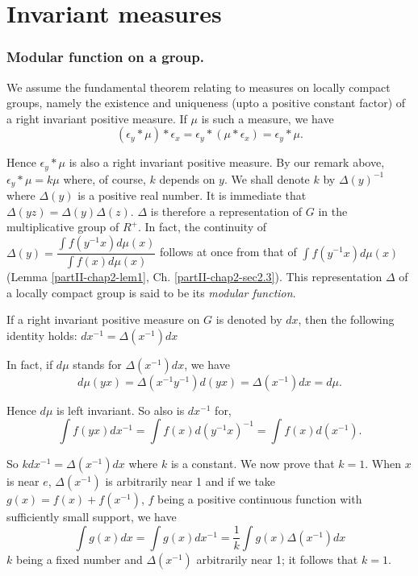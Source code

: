 
\chapter{Invariant measures}\label{partII-chap3}

\setcounter{section}{3}
\setcounter{subsection}{0}
\subsection{Modular function on a
  group.}\label{partII-chap3-sec3.1}\pageoriginale%

We assume the fundamental theorem relating to measures on locally
compact groups, namely the existence and uniqueness (upto a positive
constant factor) of a right invariant positive measure. If $\mu$ is
such a measure, we have 
$$
(\epsilon_y * \mu) * \epsilon_x = \epsilon_y  * (\mu * \epsilon_x) =
\epsilon_y * \mu. 
$$

Hence $\epsilon_y * \mu$ is also a right invariant positive measure. By our
remark above, $\epsilon_y*\mu=k\mu$ where, of course, $k$ depends on
$y$. We shall denote $k$ by $\Delta (y)^{-1}$  where $\Delta  (y)$
is a positive real number. It is immediate that $\Delta (yz) =
\Delta (y) \Delta (z)$. $\Delta$ is therefore a
representation of $G$  in the multiplicative group of $R^+$. In fact,
the continuity of $\Delta (y) = \dfrac{\int f(y^{-1}x) d\mu (x)}
{\int f (x) d \mu (x)}$ follows at once from that of $\int f (y^{-1}
x) d \mu (x)$ (Lemma \ref{partII-chap2-lem1},
Ch. \ref{partII-chap2-sec2.3}). This representation $\Delta$ of a 
locally compact group is said to be its \textit{modular function}. 
  
\setcounter{proposition}{0}
\begin{proposition}\label{partII-chap3-prop1}%
If a right invariant positive measure on $G$ is denoted by $dx$, then
 the following identity holds: $dx^{-1}=\Delta  (x^{-1} )dx$ 
\end{proposition}


In fact, if $d\mu$ stands for $\Delta (x^{-1}) dx$, we have
$$
d\mu(yx)= \Delta (x^{-1}y^{-1}) d(yx)=\Delta (x^{-1}) dx=d\mu.
$$

Hence $d\mu$ is left invariant. So also is $dx^{-1}$ for,
$$
\int f(yx) dx^{-1} = \int f(x) d(y^{-1} x)^{-1} = \int f(x) d(x^{-1}).
$$

So $k dx^{-1}=\Delta (x^{-1})dx$ where $k$ is a constant. We now
prove that $k=1$. 
When $x$ is near $e$, $\Delta (x^{-1})$ is arbitrarily near 1 and
if we take $g(x) = f(x) +f(x^{-1})$,\pageoriginale 
$f$ being a positive continuous function with sufficiently small
support, we have  
$$
\int g(x) dx = \int g(x) dx^{-1} = \frac{1}{k} \int g(x) \Delta (x^{-1}) dx
$$
$k$ being a fixed number and $\Delta (x^{-1})$ arbitrarily near 1;
it follows that $k = 1$. 

